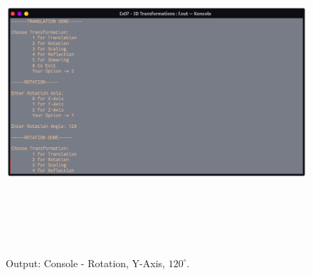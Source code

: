 \documentclass[12pt, a4]{article}
\begin{document}
\subsection*{}
\begin{figure}[h]
\centering
\caption{Output: Console - Rotation, Y-Axis, $120^{\circ}$.}
\includegraphics[height=12cm, width=17cm]{Outputs/Console-2.png}
\end{figure}

\newpage
\end{document}
